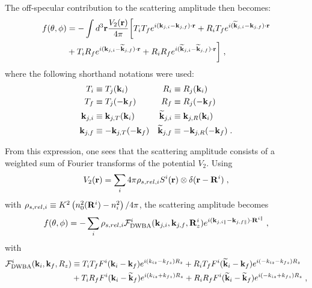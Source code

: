 The off-specular contribution to the scattering amplitude then becomes:
\begin{align*}
  f(\theta, \phi) &= -\int d^3\mathbf{r} \frac{V_2(\mathbf{r})}{4\pi} \biggl[ T_iT_fe^{i(\mathbf{k}_{j,i}-\mathbf{k}_{j,f})\cdot\mathbf{r}} + R_iT_fe^{i(\mathbf{\widetilde{k}}_{j,i}-\mathbf{k}_{j,f})\cdot\mathbf{r}} \\
   & + T_iR_fe^{i(\mathbf{k}_{j,i}-\mathbf{\widetilde{k}}_{j,f})\cdot\mathbf{r}} + R_iR_fe^{i(\mathbf{\widetilde{k}}_{j,i}-\mathbf{\widetilde{k}}_{j,f})\cdot\mathbf{r}} \biggr] \; ,
\end{align*}
where the following shorthand notations were used:
\begin{align*}
  T_i &\equiv  T_j(\mathbf{k}_i) & R_i &\equiv  R_j(\mathbf{k}_i)  \\
  T_f &\equiv  T_j(-\mathbf{k}_f) & R_f &\equiv  R_j(-\mathbf{k}_f) \\
  \mathbf{k}_{j,i} &\equiv \mathbf{k}_{j,T}(\mathbf{k}_i) & \mathbf{\widetilde{k}}_{j,i} &\equiv \mathbf{k}_{j,R}(\mathbf{k}_i)  \\
  \mathbf{k}_{j,f} &\equiv -\mathbf{k}_{j,T}(-\mathbf{k}_f) & \mathbf{\widetilde{k}}_{j,f} &\equiv -\mathbf{k}_{j,R}(-\mathbf{k}_f) \; .
\end{align*}

From this expression, one sees that the scattering amplitude consists of a weighted sum of Fourier transforms of the potential $V_2$. Using
\begin{equation*}
  V_2(\mathbf{r}) = \sum_i 4\pi \rho_{s,rel,i} S^i(\mathbf{r}) \otimes \delta(\mathbf{r} - \mathbf{R}^i) \; ,
\end{equation*}
with $\rho_{s,rel,i}\equiv  K^2\left( n_0^2(\mathbf{R}^i) - n_i^2 \right)/4\pi$, the scattering amplitude becomes
\begin{equation*}
  f(\theta, \phi) = -\sum_i  \rho_{s,rel,i} \mathcal{F}^i_{\text{DWBA}}(\mathbf{k}_{j,i},\mathbf{k}_{j,f},\mathbf{R}^i_z)e^{i(\mathbf{k}_{j,i\parallel}-\mathbf{k}_{j,f\parallel})\cdot \mathbf{R}^{i\parallel} } \; ,
\end{equation*}
with
\begin{align*}
  \mathcal{F}^i_\text{DWBA}(\mathbf{k}_i,\mathbf{k}_f,R_z) & \equiv T_iT_fF^i(\mathbf{k}_i-\mathbf{k}_f)e^{i(k_{iz}-k_{fz})R_z} + R_iT_fF^i(\mathbf{\widetilde{k}}_i-\mathbf{k}_f)e^{i(-k_{iz}-k_{fz})R_z} \\
  & + T_iR_fF^i(\mathbf{k}_i-\mathbf{\widetilde{k}}_f)e^{i(k_{iz}+k_{fz})R_z} + R_iR_fF^i(\mathbf{\widetilde{k}}_i-\mathbf{\widetilde{k}}_f)e^{i(-k_{iz}+k_{fz})R_z} \; ,
\end{align*}

